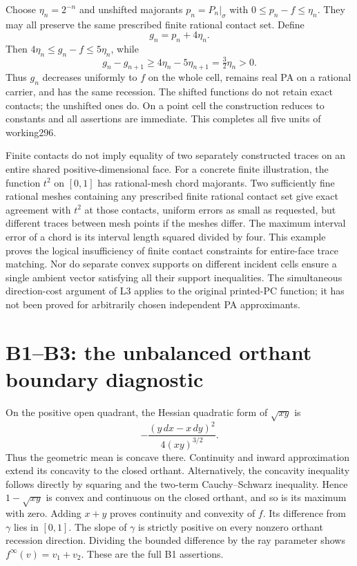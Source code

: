 \documentclass[
  11pt,
]{article}
\begin{document}
Choose \(\eta_n=2^{-n}\) and unshifted majorants \(p_n=P_n|_\sigma\)
with \(0\leq p_n-f\leq\eta_n\). They may all preserve the same
prescribed finite rational contact set. Define \[ g_n=p_n+4\eta_n. \]
Then \(4\eta_n\leq g_n-f\leq5\eta_n\), while
\[ g_n-g_{n+1}\geq4\eta_n-5\eta_{n+1}=\tfrac32\eta_n>0. \] Thus \(g_n\)
decreases uniformly to \(f\) on the whole cell, remains real PA on a
rational carrier, and has the same recession. The shifted functions do
not retain exact contacts; the unshifted ones do. On a point cell the
construction reduces to constants and all assertions are immediate. This
completes all five units of working296.

Finite contacts do not imply equality of two separately constructed
traces on an entire shared positive-dimensional face. For a concrete
finite illustration, the function \(t^2\) on \([0,1]\) has rational-mesh
chord majorants. Two sufficiently fine rational meshes containing any
prescribed finite rational contact set give exact agreement with \(t^2\)
at those contacts, uniform errors as small as requested, but different
traces between mesh points if the meshes differ. The maximum interval
error of a chord is its interval length squared divided by four. This
example proves the logical insufficiency of finite contact constraints
for entire-face trace matching. Nor do separate convex supports on
different incident cells ensure a single ambient vector satisfying all
their support inequalities. The simultaneous direction-cost argument of
L3 applies to the original printed-PC function; it has not been proved
for arbitrarily chosen independent PA approximants.

\section{B1--B3: the unbalanced orthant boundary
diagnostic}\label{b1b3-the-unbalanced-orthant-boundary-diagnostic}

On the positive open quadrant, the Hessian quadratic form of
\(\sqrt{xy}\) is \[ -\frac{(y\,dx-x\,dy)^2}{4(xy)^{3/2}}. \] Thus the
geometric mean is concave there. Continuity and inward approximation
extend its concavity to the closed orthant. Alternatively, the concavity
inequality follows directly by squaring and the two-term Cauchy--Schwarz
inequality. Hence \(1-\sqrt{xy}\) is convex and continuous on the closed
orthant, and so is its maximum with zero. Adding \(x+y\) proves
continuity and convexity of \(f\). Its difference from \(\gamma\) lies
in \([0,1]\). The slope of \(\gamma\) is strictly positive on every
nonzero orthant recession direction. Dividing the bounded difference by
the ray parameter shows \(f^\infty(v)=v_1+v_2\). These are the full B1
assertions.
\end{document}
